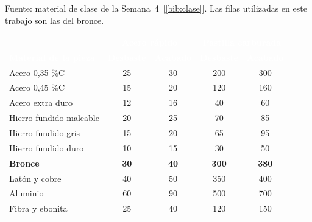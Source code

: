 \documentclass[12pt,a4paper]{article}
\newcommand{\encab}[1]{\textcolor{white}{\sffamily\bfseries #1}}
\newcommand{\refbib}[1]{[\ref{#1}]}
\begin{document}
Fuente: material de clase de la Semana~4~\refbib{bib:clase}. Las filas utilizadas
en este trabajo son las del bronce.

\begin{table}[!htb]
	\centering
	\small
	\begin{tabular}{l c c c c}
		\rowcolor{darkblue}
		                             & \multicolumn{2}{c}{\encab{Acero rápido}} &
		\multicolumn{2}{c}{\encab{Pastilla carburada}}
		\\
		\rowcolor{darkblue}
		\encab{Material de la pieza} & \encab{Desbaste}                         &
		\encab{Acabado}              &
		\encab{Desbaste}             & \encab{Acabado}
		\\
		Acero 0,35 \%C               & 25                                       & 30
		                             & 200                                      & 300                              \\
		Acero 0,45 \%C               & 15                                       & 20
		                             & 120                                      & 160                              \\
		Acero extra duro             & 12                                       & 16
		                             & 40                                       & 60                               \\
		Hierro fundido maleable      & 20                                       & 25
		                             & 70                                       & 85                               \\
		Hierro fundido gris          & 15                                       & 20
		                             & 65                                       & 95                               \\
		Hierro fundido duro          & 10                                       & 15          & 30           & 50  \\
		\textbf{Bronce}              & \textbf{30}                              & \textbf{40} & \textbf{300} &
		\textbf{380}                                                                                               \\
		Latón y cobre                & 40                                       & 50          & 350          & 400 \\
		Aluminio                     & 60                                       & 90          & 500          & 700 \\
		Fibra y ebonita              & 25                                       & 40
		                             & 120                                      & 150                              \\
	\end{tabular}
\end{table}
\end{document}
